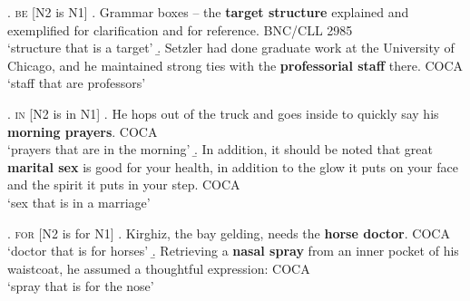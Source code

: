 \ex. \textsc{be} [N2 is N1]
\a. \label{ex:target_structure}
Grammar boxes -- the \textbf{target structure} explained and exemplified for
clarification and for reference. BNC/CLL 2985 
\\`structure that is a target'
\b. \label{ex:professorial_staff}
Setzler had done graduate work at the University of Chicago, and he
maintained strong ties with the \textbf{professorial staff} there. COCA
\\`staff that are professors'

\ex. \textsc{in} [N2 is in N1]
\a. \label{ex:morning_prayers}
He hops out of the truck and goes inside to quickly say his \textbf{morning
prayers}. COCA
\\ `prayers that are in the morning'
\b. \label{ex:marital_sex }%
In addition, it should be noted that great \textbf{marital sex} is good for your
health, in addition to the glow it puts on your face and the spirit it puts in
your step. COCA
\\`sex that is in a marriage'

\ex. \textsc{for} [N2 is for N1]
\a.  \label{ex:horse_doctor}
Kirghiz, the bay gelding, needs the \textbf{horse doctor}. COCA
\\
`doctor that is for horses'
\b. \label{ex:nasal_spray}
Retrieving a \textbf{nasal spray} from an inner pocket of his waistcoat, he assumed
a thoughtful expression: COCA
\\
`spray that is for the nose'


